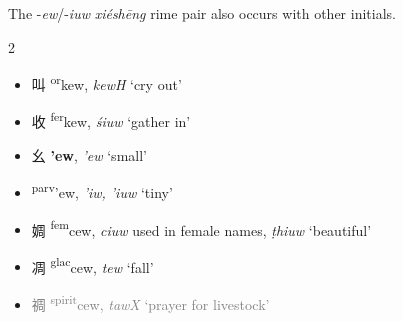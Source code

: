 The -\textit{ew}/-\textit{iuw} \textit{xiéshēng} rime pair also occurs with other initials.  

\begin{multicols}{2}
\raggedcolumns

\begin{itemize}

    \item {\Large{叫}} %
    {\large{{\textsuperscript{or}}kew}},
    \textit{kewH} `cry out'        %

    \item {\Large{收}} %
    {\large{\textsuperscript{fer}kew}},
    \textit{śiuw} `gather in'        %

\end{itemize}

\medskip

\begin{itemize}

    \item {\Large{幺}} %
    {\large{\textbf{'ew}}},
    \textit{'ew} `small'        %

    \item {\Large{}} %
    {\large{{\textsuperscript{parv}}'ew}},
    \textit{'iw, 'iuw} `tiny'        %


\end{itemize}
\medskip


\begin{itemize}

    \item {\Large{婤}} %
    {\large{{\textsuperscript{fem}}cew}},
    \textit{ciuw} used in female names, \textit{ṭhiuw} `beautiful'       %

    \item {\Large{凋}} %
    {\large{{\textsuperscript{glac}}cew}},
    \textit{tew} `fall'        %

\item \textcolor{gray}{{\Large{禂}} %
{\large{{\textsuperscript{spirit}}cew}},
\textit{tawX} `prayer for livestock'}        %

\end{itemize}


\end{multicols}
